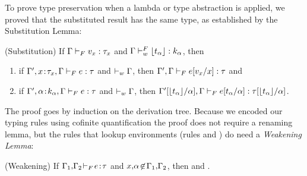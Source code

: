 %
To prove type preservation when
a lambda or type abstraction is applied, 
we proved that the substituted result 
has the same type, as established by 
the Substitution Lemma:
%
\begin{lemma}(Substitution)\label{lem:substitutionFF}
If $\hasftype{\tcenv}{\sval_x}{\sftype_x}$ 
and $\isWFFT{\tcenv}{\forgetreft{\stype_{\al}}}{k_{\al}}$, then 
\begin{enumerate}
\item if\; $\hasftype{\tcenv', \bind{x}{\sftype_x}, \tcenv}{\sexpr}{\sftype}$
    and\; $\isWFFE{\tcenv}$, then
    ${\hasftype{\tcenv', \tcenv}{\subst{\sexpr}{x}{\sval_x}}{\sftype}}$ and 
\item if\; $\hasftype{\tcenv', \bind{\al}{k_{\al}}, \tcenv}{\sexpr}{\sftype}$
    and\; $\isWFFE{\tcenv}$, then
    ${\hasftype{\subst{\tcenv'}{\al}{\forgetreft{\stype_{\al}}}, \tcenv}
               {\subst{\sexpr}{\al}{\stype_{\al}}}
               {\subst{\sftype}{\al}{\forgetreft{\stype_{\al}}}}}$.
\end{enumerate}
\end{lemma}

The proof goes by induction on the derivation tree. 
Because we encoded our typing rules using 
cofinite quantification %
the proof does not require a renaming lemma, but 
the rules that lookup environments 
(rules \tVar and \wtVar) do need a \emph{Weakening Lemma}:

\begin{lemma}(Weakening) \label{lem:weakeningF}
If $\hasftype{\tcenv_1,\!\tcenv_2\!}{\!\sexpr\!}{\!\sftype}$ and 
   $x,\!\al\! \not\in\! {\tcenv_1, \!\tcenv_2}$,
then 
    and
    .
\end{lemma}



